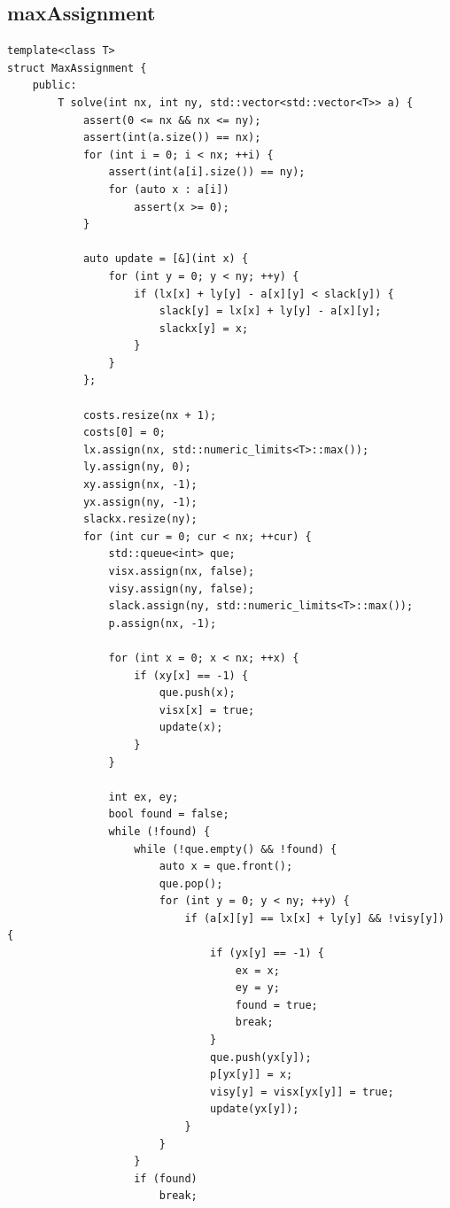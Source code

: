 \documentclass[twoside]{article}
\begin{document}
\subsection{maxAssignment}
\begin{lstlisting}
template<class T>
struct MaxAssignment {
    public:
        T solve(int nx, int ny, std::vector<std::vector<T>> a) {
            assert(0 <= nx && nx <= ny);
            assert(int(a.size()) == nx);
            for (int i = 0; i < nx; ++i) {
                assert(int(a[i].size()) == ny);
                for (auto x : a[i])
                    assert(x >= 0);
            }
             
            auto update = [&](int x) {
                for (int y = 0; y < ny; ++y) {
                    if (lx[x] + ly[y] - a[x][y] < slack[y]) {
                        slack[y] = lx[x] + ly[y] - a[x][y];
                        slackx[y] = x;
                    }
                }
            };
             
            costs.resize(nx + 1);
            costs[0] = 0;
            lx.assign(nx, std::numeric_limits<T>::max());
            ly.assign(ny, 0);
            xy.assign(nx, -1);
            yx.assign(ny, -1);
            slackx.resize(ny);
            for (int cur = 0; cur < nx; ++cur) {
                std::queue<int> que;
                visx.assign(nx, false);
                visy.assign(ny, false);
                slack.assign(ny, std::numeric_limits<T>::max());
                p.assign(nx, -1);
                 
                for (int x = 0; x < nx; ++x) {
                    if (xy[x] == -1) {
                        que.push(x);
                        visx[x] = true;
                        update(x);
                    }
                }
                 
                int ex, ey;
                bool found = false;
                while (!found) {
                    while (!que.empty() && !found) {
                        auto x = que.front();
                        que.pop();
                        for (int y = 0; y < ny; ++y) {
                            if (a[x][y] == lx[x] + ly[y] && !visy[y]) {
                                if (yx[y] == -1) {
                                    ex = x;
                                    ey = y;
                                    found = true;
                                    break;
                                }
                                que.push(yx[y]);
                                p[yx[y]] = x;
                                visy[y] = visx[yx[y]] = true;
                                update(yx[y]);
                            }
                        }
                    }
                    if (found)
                        break;
                     

\end{lstlisting}
\end{document}
